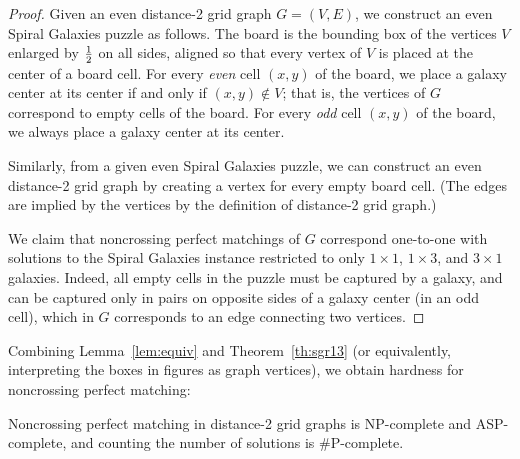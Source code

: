 \begin {proof}
  Given an even distance-2 grid graph $G = (V, E)$,
  we construct an even Spiral Galaxies puzzle as follows.
  The board is the bounding box of the vertices $V$ enlarged by $1\over2$ on all sides, aligned so that every vertex of $V$ is placed at the center of a board cell.
  For every \emph{even} cell $(x, y)$ of the board, we place a galaxy center at its center if and only if $(x, y) \notin V$; that is, the vertices of $G$ correspond to empty cells of the board.
  For every \emph{odd} cell $(x, y)$ of the board, we always place a galaxy center at its center.
  
  Similarly, from a given even Spiral Galaxies puzzle, we can construct an even distance-2 grid graph by creating a vertex for every empty board cell. (The edges are implied by the vertices by the definition of distance-2 grid graph.)
  
  We claim that noncrossing perfect matchings of $G$ correspond one-to-one with solutions to the Spiral Galaxies instance restricted to only $1\times1$, $1\times3$, and $3\times1$ galaxies.
  Indeed, all empty cells in the puzzle must be captured by a galaxy, and can be captured only in pairs on opposite sides of a galaxy center (in an odd cell), which in $G$ corresponds to an edge connecting two vertices.
\end {proof}


Combining Lemma~\ref {lem:equiv} and Theorem~\ref{th:sgr13}
(or equivalently, interpreting the boxes in figures as graph vertices),
we obtain hardness for noncrossing perfect matching:
\begin{corollary}
Noncrossing perfect matching in distance-2 grid graphs
is NP-complete and ASP-complete, and counting the number of solutions is \#P-complete.
\end{corollary}


